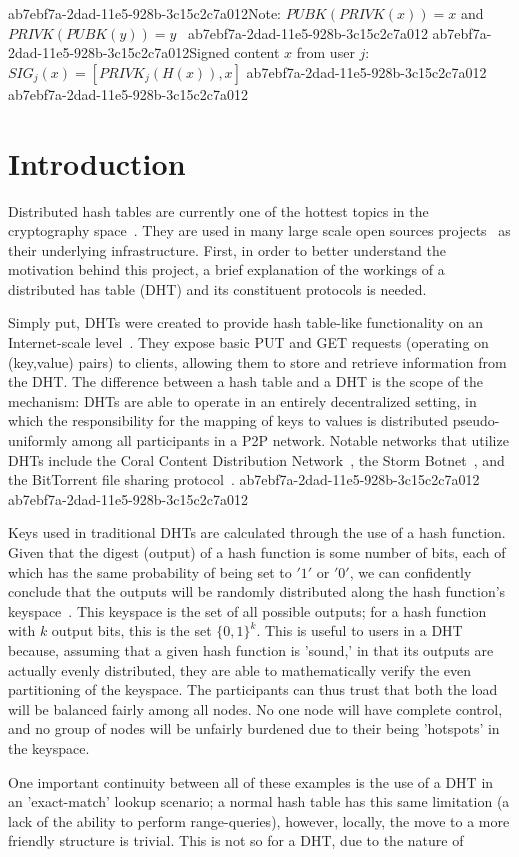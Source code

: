 \documentclass[12pt]{article}
\begin{document}
ab7ebf7a-2dad-11e5-928b-3c15c2c7a012Note: $PUBK(PRIVK(x)) = x$ and $PRIVK(PUBK(y)) = y$~
ab7ebf7a-2dad-11e5-928b-3c15c2c7a012
ab7ebf7a-2dad-11e5-928b-3c15c2c7a012Signed content $x$ from user $j$: $SIG_j(x) = \left[ PRIVK_j( H(x) ), x \right]$
ab7ebf7a-2dad-11e5-928b-3c15c2c7a012
ab7ebf7a-2dad-11e5-928b-3c15c2c7a012\section{Introduction}
\par Distributed hash tables are currently one of the hottest topics in the cryptography space~\cite{Stoica:2001dj,Rowstron:2001ea,Ratnasamy:2001wn}. They are used in many large scale open sources projects~\cite{Freitas:2013tb,Xu:2010vs,Perfitt:2010fh} as their underlying infrastructure. First, in order to better understand the motivation behind this project, a brief explanation of the workings of a distributed has table (DHT) and its constituent protocols is needed.

\par Simply put, DHTs were created to provide hash table-like functionality on an Internet-scale level~\cite{Ratnasamy:2001wn}. They expose basic PUT and GET requests (operating on (key,value) pairs) to clients, allowing them to store and retrieve information from the DHT. The difference between a hash table and a DHT is the scope of the mechanism: DHTs are able to operate in an entirely decentralized setting, in which the responsibility for the mapping of keys to values is distributed pseudo-uniformly among all participants in a P2P network. Notable networks that utilize DHTs include the Coral Content Distribution Network~\cite{Freedman:2004vb}, the Storm Botnet~\cite{Holz:2008uk}, and the BitTorrent file sharing protocol~\cite{Cohen:y1_8mBnw}.
ab7ebf7a-2dad-11e5-928b-3c15c2c7a012
ab7ebf7a-2dad-11e5-928b-3c15c2c7a012\par Keys used in traditional DHTs are calculated through the use of a hash function. Given that the digest (output) of a hash function is some number of bits, each of which has the same probability of being set to $'1'$ or $'0'$, we can confidently conclude that the outputs will be randomly distributed along the hash function's keyspace~. This keyspace is the set of all possible outputs; for a hash function with $k$ output bits, this is the set $\{0,1\}^k$. This is useful to users in a DHT because, assuming that a given hash function is 'sound,' in that its outputs are actually evenly distributed, they are able to mathematically verify the even partitioning of the keyspace. The participants can thus trust that both the load will be balanced fairly among all nodes. No one node will have complete control, and no group of nodes will be unfairly burdened due to their being 'hotspots' in the keyspace.~

\par One important continuity between all of these examples is the use of a DHT in an 'exact-match' lookup scenario; a normal hash table has this same limitation (a lack of the ability to perform range-queries), however, locally, the move to a more friendly structure is trivial. This is not so for a DHT, due to the nature of
\printbibliography
\end{document}
